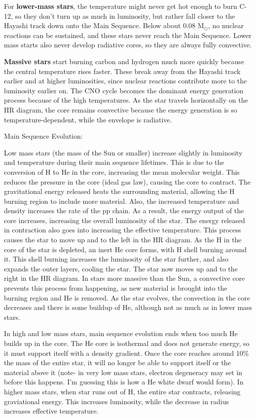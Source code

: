 For \textbf{lower-mass stars}, the temperature might never get hot enough to burn C-12, so they don't turn up as much in luminosity, but rather fall closer to the Hayashi track down onto the Main Sequence. Below about 0.08 M$_\odot$, no nuclear reactions can be sustained, and these stars never reach the Main Sequence. Lower mass starts also never develop radiative cores, so they are always fully convective.

\textbf{Massive stars} start burning carbon and hydrogen much more quickly because the central temperature rises faster. These break away from the Hayashi track earlier and at higher luminosities, since nuclear reactions contribute more to the luminosity earlier on. The CNO cycle becomes the dominant energy generation process because of the high temperatures. As the star travels horizontally on the HR diagram, the core remains convective because the energy generation is so temperature-dependent, while the envelope is radiative.

Main Sequence Evolution:

Low mass stars (the mass of the Sun or smaller) increase slightly in luminosity and temperature 
during their main sequence lifetimes.  This is due to the conversion of H to He in the core, 
increasing the mean molecular weight.  This reduces the pressure in the core (ideal gas law), 
causing the core to contract.  The gravitational energy released heats the surrounding material, 
allowing the H burning region to include more material.  Also, the increased temperature and 
density increases the rate of the pp chain.  As a result, the energy output of the core increases, 
increasing the overall luminosity of the star.  The energy released in contraction also goes 
into increasing the effective temperature.  This process causes the star to move up and to the 
left in the HR diagram.  As the H in the core of the star is depleted, an 
inert He core forms, with H shell burning around it.  This shell burning increases the luminosity 
of the star further, and also expands the outer layers, cooling the star.  The star now moves 
up and to the right in the HR diagram.  In stars more massive than the Sun, a convective 
core prevents this process from happening, as new material is brought into the burning region and 
He is removed.  As the star evolves, the convection in the core decreases and there is some 
buildup of He, although not as much as in lower mass stars.  

In high and low mass stars, main sequence evolution ends when too much He builds up in the core.  
The He core is isothermal and does not generate energy, so it must support itself with a density 
gradient.  Once the core reaches around 10\% the mass of the entire star, it will no longer 
be able to support itself or the material above it (note- in very low mass stars, electron 
degeneracy may set in before this happens.  I'm guessing this is how a He white dwarf would form). 
In higher mass stars, when star runs out of H, the entire star contracts, releasing graviational 
energy.  This increases luminosity, while the decrease in radius increases effective temperature.  

